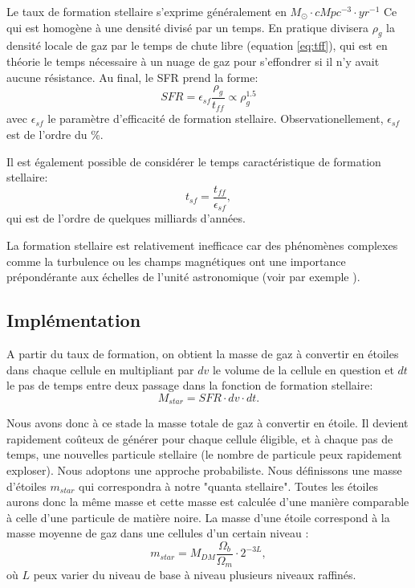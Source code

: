 Le taux de formation stellaire s'exprime généralement en $M_\odot \cdot cMpc^{-3} \cdot yr^{-1}$  
Ce qui est homogène à une densité divisé par un temps.
En pratique divisera $\rho_g$ la densité locale de gaz par le temps de chute libre (equation \ref{eq:tff}), qui est en théorie le temps nécessaire à un nuage de gaz pour s'effondrer si il n'y avait aucune résistance.
Au final, le \ac{SFR} prend la forme:
\begin{equation}
	SFR = \epsilon_{sf} \frac{\rho_g}{t_{ff}} \propto \rho_g^{1.5}
    \label{eq_sfr}
\end{equation}
avec  $\epsilon_{sf}$ le paramètre d'efficacité de formation stellaire.
Observationellement, $\epsilon_{sf}$  est de l'ordre du \%. %

Il est également possible de considérer le temps caractéristique de formation stellaire:
\begin{equation}
t_{sf} =  \frac{t_{ff}}{ \epsilon_{sf} },
\end{equation}
qui est de l'ordre de quelques milliards d'années.

La formation stellaire est relativement inefficace car des phénomènes complexes comme la turbulence ou les champs magnétiques ont une importance prépondérante aux échelles de l'unité astronomique
(voir par exemple \cite{2015MNRAS.450.4035F}).

\subsection{Implémentation}

A partir du taux de formation, on obtient la masse de gaz à convertir en étoiles dans chaque cellule en multipliant par $dv$ le volume de la cellule en question et $dt$ le pas de temps entre deux passage dans la fonction de formation stellaire:
\begin{equation}
	M_{star} = SFR \cdot dv \cdot dt .
\end{equation}

Nous avons donc à ce stade la masse totale de gaz à convertir en étoile.
Il devient rapidement coûteux de générer pour chaque cellule éligible, et à chaque pas de temps, une nouvelles particule stellaire (le nombre de particule peux rapidement exploser).
Nous adoptons une approche probabiliste.
Nous définissons une masse d'étoiles $m_{star}$ qui correspondra à notre "quanta stellaire".
Toutes les étoiles aurons donc la même masse et cette masse est calculée d'une manière comparable à celle d'une particule de matière noire.
La masse d'une étoile correspond à la masse moyenne de gaz dans une cellules d'un certain niveau :
\begin{equation}
 m_{star} = M_{DM} \frac{\Omega_b}{\Omega_m}\cdot 2^{-3L},
\end{equation}
où $L$ peux varier du niveau de base à niveau plusieurs niveaux raffinés.


